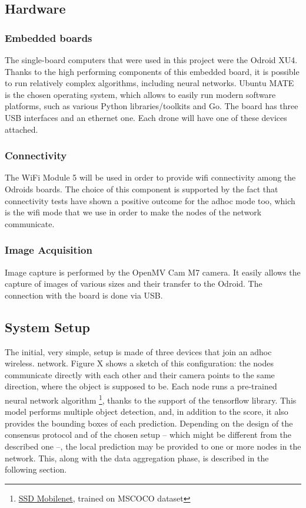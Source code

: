 \documentclass[10pt,conference,compsocconf]{IEEEtran}
\begin{document}
\subsection{Hardware}
\subsubsection{Embedded boards}
The single-board computers that were used in this project were the Odroid XU4. Thanks to the high performing components of this embedded board, it is possible to run relatively complex algorithms, including neural networks. Ubuntu MATE is the chosen operating system, which allows to easily run modern software platforms, such as various Python libraries/toolkits and Go. The board has three USB interfaces and an ethernet one. Each drone will have one of these devices attached.
\subsubsection{Connectivity}
The WiFi Module 5 will be used in order to provide wifi connectivity among the Odroids boards. The choice of this component is supported by the fact that connectivity tests have shown a positive outcome for the adhoc mode too, which is the wifi mode that we use in order to make the nodes of the network communicate.
\subsubsection{Image Acquisition}
Image capture is performed by the OpenMV Cam M7 camera. It easily allows the capture of images of various sizes and their transfer to the Odroid. The connection with the board is done via USB.
\subsection{System Setup}
The initial, very simple, setup is made of three devices that join an adhoc wireless. network. Figure X shows a sketch of this configuration: the nodes communicate directly with each other and their camera points to the same direction, where the object is supposed to be. Each node runs a pre-trained neural network algorithm \footnote{\href{https://github.com/tensorflow/models/blob/master/research/object\_detection/g3doc/detection_model_zoo.md}{SSD Mobilenet}, trained on MSCOCO dataset}, thanks to the support of the tensorflow library. This model performs multiple object detection, and, in addition to the score, it also provides the bounding boxes of each prediction. Depending on the design of the consensus protocol and of the chosen setup -- which might be different from the described one --, the local prediction may be provided to one or more nodes in the network. This, along with the data aggregation phase, is described in the following section.
\end{document}

